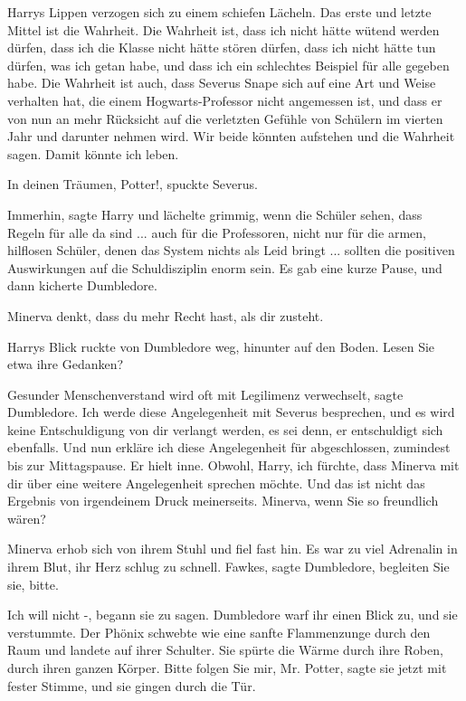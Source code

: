 Harrys Lippen verzogen sich zu einem schiefen Lächeln. \glqq{}Das erste und
letzte Mittel ist die Wahrheit. Die Wahrheit ist, dass ich nicht hätte wütend
werden dürfen, dass ich die Klasse nicht hätte stören dürfen, dass ich nicht
hätte tun dürfen, was ich getan habe, und dass ich ein schlechtes Beispiel für
alle gegeben habe. Die Wahrheit ist auch, dass Severus Snape sich auf eine Art
und Weise verhalten hat, die einem Hogwarts-Professor nicht angemessen ist, und
dass er von nun an mehr Rücksicht auf die verletzten Gefühle von Schülern im
vierten Jahr und darunter nehmen wird. Wir beide könnten aufstehen und die
Wahrheit sagen. Damit könnte ich leben.\grqq{}

\glqq{}In deinen Träumen, Potter!\grqq{}, spuckte Severus.

\glqq{}Immerhin\grqq{}, sagte Harry und lächelte grimmig, \glqq{}wenn die Schüler
sehen, dass Regeln für alle da sind ... auch für die Professoren, nicht nur für
die armen, hilflosen Schüler, denen das System nichts als Leid bringt ...
sollten die positiven Auswirkungen auf die Schuldisziplin enorm sein.\grqq{} Es
gab eine kurze Pause, und dann kicherte Dumbledore.

\glqq{}Minerva denkt, dass du mehr Recht hast, als dir zusteht.\grqq{}

Harrys Blick ruckte von Dumbledore weg, hinunter auf den Boden. \glqq{}Lesen Sie
etwa ihre Gedanken?\grqq{}

\glqq{}Gesunder Menschenverstand wird oft mit Legilimenz verwechselt\grqq{},
sagte Dumbledore. \glqq{}Ich werde diese Angelegenheit mit Severus besprechen,
und es wird keine Entschuldigung von dir verlangt werden, es sei denn, er
entschuldigt sich ebenfalls. Und nun erkläre ich diese Angelegenheit für
abgeschlossen, zumindest bis zur Mittagspause.\grqq{} Er hielt inne. \glqq{}
Obwohl, Harry, ich fürchte, dass Minerva mit dir über eine weitere Angelegenheit
sprechen möchte. Und das ist nicht das Ergebnis von irgendeinem Druck
meinerseits. Minerva, wenn Sie so freundlich wären?\grqq{}

Minerva erhob sich von ihrem Stuhl und fiel fast hin. Es war zu viel Adrenalin
in ihrem Blut, ihr Herz schlug zu schnell. \glqq{}Fawkes\grqq{}, sagte
Dumbledore, \glqq{}begleiten Sie sie, bitte.\grqq{}

\glqq{}Ich will nicht -\grqq{}, begann sie zu sagen. Dumbledore warf ihr einen
Blick zu, und sie verstummte. Der Phönix schwebte wie eine sanfte Flammenzunge
durch den Raum und landete auf ihrer Schulter. Sie spürte die Wärme durch ihre
Roben, durch ihren ganzen Körper. \glqq{}Bitte folgen Sie mir, Mr. Potter\grqq{},
sagte sie jetzt mit fester Stimme, und sie gingen durch die Tür.

